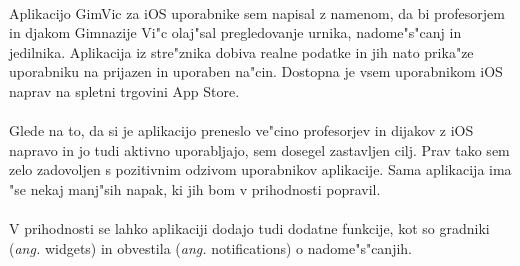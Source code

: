 \paragraph{}Aplikacijo GimVic za iOS uporabnike sem napisal z namenom, da bi profesorjem in djakom Gimnazije Vi"c olaj"sal pregledovanje urnika, nadome"s"canj in jedilnika. Aplikacija iz stre"znika dobiva realne podatke in jih nato prika"ze uporabniku na prijazen in uporaben na"cin. Dostopna je vsem uporabnikom iOS naprav na spletni trgovini App Store.

\paragraph{}Glede na to, da si je aplikacijo preneslo ve"cino profesorjev in dijakov z iOS napravo in jo tudi aktivno uporabljajo, sem dosegel zastavljen cilj. Prav tako sem zelo zadovoljen s pozitivnim odzivom uporabnikov aplikacije. Sama aplikacija ima "se nekaj manj"sih napak, ki jih bom v prihodnosti popravil.

\paragraph{}
V prihodnosti se lahko aplikaciji dodajo tudi dodatne funkcije, kot so gradniki (\textit{ang.} widgets) in obvestila (\textit{ang.} notifications) o nadome"s"canjih.
